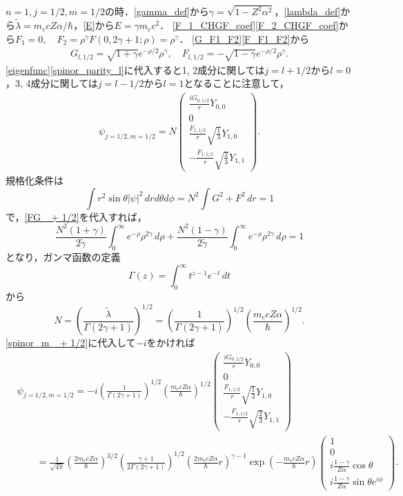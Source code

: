 $n=1,j=1/2,m=1/2$の時．\eqref{gamma_def}から$\gamma=\sqrt{1 - Z^2\alpha^2}$，\eqref{lambda_def}から$\tilde{\lambda}=m_ecZ\alpha/\hbar$，\eqref{E}から$E=\gamma m_ec^2$．
\eqref{F_1_CHGF_coef}\eqref{F_2_CHGF_coef}から$F_1=0,\quad F_2=\rho^\gamma F(0,2\gamma + 1;\rho)=\rho^\gamma$．
\eqref{G_F1_F2}\eqref{F_F1_F2}から
\begin{align}
  G_{l,1/2}=\sqrt{1 + \gamma}e^{ - \rho/2}\rho^\gamma,\quad F_{l,1/2}= - \sqrt{1 - \gamma}e^{ - \rho/2}\rho^\gamma.\label{FG_ + 1/2}
\end{align}
\eqref{eigenfunc}\eqref{spinor_parity_l}に代入すると1, 2成分に関しては$j=l + 1/2$から$l=0$，3, 4成分に関しては$j=l - 1/2$から$l=1$となることに注意して，
\begin{align}
  \psi_{j=1/2,m=1/2}=N
  \begin{pmatrix}
    \frac{iG_{0,1/2}}{r}Y_{0,0}\\
    0\\
    \frac{F_{1,1/2}}{r}\sqrt{\frac{1}{3}}Y_{1,0}\\
     - \frac{F_{1,1/2}}{r}\sqrt{\frac{2}{3}}Y_{1,1}
  \end{pmatrix}
  .\label{spinor_m_ + 1/2}
\end{align}
規格化条件は
\[\int r^2\sin\theta\lvert\psi\rvert^2\,drd\theta d\phi = N^2\int G^2 + F^2\,dr=1\]
で，\eqref{FG_ + 1/2}を代入すれば，
\[\frac{N^2(1 + \gamma)}{2\tilde{\gamma}}\int_0^\infty e^{ - \rho}\rho^{2\gamma}\,d\rho + \frac{N^2(1 - \gamma)}{2\tilde{\gamma}}\int_0^\infty e^{ - \rho}\rho^{2\gamma}\,d\rho=1\]
となり，ガンマ函数の定義
\[\Gamma(z)=\int_0^\infty t^{z - 1}e^{ - t}\,dt\]
から
\[N=\left(\frac{\tilde{\lambda}}{\Gamma(2\gamma + 1)}\right)^{1/2}=\left(\frac{1}{\Gamma(2\gamma + 1)}\right)^{1/2}\left(\frac{m_ecZ\alpha}{\hbar}\right)^{1/2}.\]
\eqref{spinor_m_ + 1/2}に代入して$ - i$をかければ
\begin{align*}
  & \psi_{j=1/2,m=1/2} =  - i\left(\frac{1}{\Gamma(2\gamma + 1)}\right)^{1/2}\left(\frac{m_ecZ\alpha}{\hbar}\right)^{1/2}
  \begin{pmatrix}
    \frac{iG_{0,1/2}}{r}Y_{0,0}\\
    0\\
    \frac{F_{1,1/2}}{r}\sqrt{\frac{1}{3}}Y_{1,0}\\
     - \frac{F_{1,1/2}}{r}\sqrt{\frac{2}{3}}Y_{1,1}
  \end{pmatrix}
  \\
  & \qquad = \frac{1}{\sqrt{4\pi}}\left(\frac{2m_ecZ\alpha}{\hbar}\right)^{3/2}\left(\frac{\gamma + 1}{2\Gamma(2\gamma + 1)}\right)^{1/2}\left(\frac{2m_ecZ\alpha}{\hbar}r\right)^{\gamma - 1}\exp\left( - \frac{m_ecZ\alpha}{\hbar}r\right)
  \begin{pmatrix}
    1\\
    0\\
    i\frac{1 - \gamma}{Z\alpha}\cos\theta\\
    i\frac{1 - \gamma}{Z\alpha}\sin\theta e^{i\phi}
  \end{pmatrix}
  .
\end{align*}

